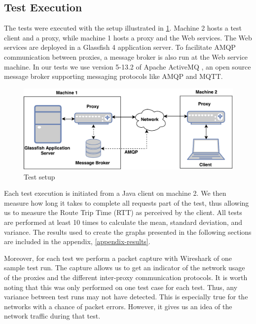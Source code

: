 \subsection{Test Execution}

The tests were executed with the setup illustrated in
\cref{figure-testing-setup}. Machine 2 hosts a test client and a proxy, while
machine 1 hosts a proxy and the Web services. The Web services are deployed in a
Glassfish 4 application server. To facilitate AMQP communication between
proxies, a message broker is also run at the Web service machine. In our tests
we use version 5-13.2 of Apache ActiveMQ \cite{activemq-homepage}, an open
source message broker supporting messaging protocols like AMQP and MQTT.

\begin{figure}[h]
\includegraphics[width=\textwidth]{images/testing_setup.pdf}
\caption{Test setup}
\label{figure-testing-setup}
\end{figure}

Each test execution is initiated from a Java client on machine 2. We then
measure how long it takes to complete all requests part of the test, thus
allowing us to measure the Route Trip Time (RTT) as perceived by the client. All
tests are performed at least 10 times to calculate the mean, standard deviation,
and variance. The results used to create the graphs presented in the following
sections are included in the appendix, \cref{appendix-results}.


Moreover, for each test we perform a packet capture with Wireshark of one sample
test run. The capture allows us to get an indicator of the network usage of the
proxies and the different inter-proxy communication protocols. It is worth
noting that this was only performed on one test case for each test. Thus, any
variance between test runs may not have detected. This is especially true for
the networks with a chance of packet errors. However, it gives us an idea of
the network traffic during that test.

